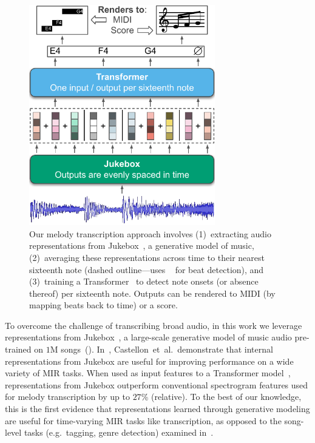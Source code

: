 \begin{figure}
    \centering
    \includegraphics[width=8.1cm]{figs/fig1.pdf}
    \caption{
Our melody transcription approach involves 
(1)~extracting audio representations from Jukebox~\cite{dhariwal2020jukebox}, a generative model of music, 
(2)~averaging these representations across time to their nearest sixteenth note (dashed outline---uses \madmom{}~\cite{bock2016joint,bock2016madmom} for beat detection),
and
(3)~training a Transformer~\cite{vaswani2017attention} to detect note onsets (or absence thereof) per sixteenth note. 
Outputs can be rendered to MIDI (by mapping beats back to time) or a score.
}
 \label{fig:fig1}
\end{figure}

To overcome the challenge of transcribing broad audio, in this work we leverage representations from Jukebox~\cite{dhariwal2020jukebox}, a large-scale generative model of music audio pre-trained on $1$M songs~(). 
In~\cite{castellon2021calm}, Castellon~et~al.\ demonstrate that internal representations from Jukebox are useful for improving performance on a wide variety of MIR tasks. 
When used as input features to a Transformer model~\cite{vaswani2017attention}, representations from Jukebox outperform conventional spectrogram features used for melody transcription by 
up to $27$\% (relative). 
To the best of our knowledge, this is the first evidence that representations learned through generative modeling are useful for time-varying MIR tasks like transcription, as opposed to the song-level tasks (e.g.~tagging, genre detection) examined in~\cite{castellon2021calm}.

